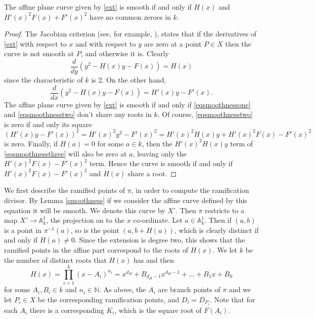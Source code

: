     \begin{lem}\label{smoothness}
    The affine plane curve given by \eqref{ext} is smooth if and only if $H(x)$ and $H'(x)^2 F(x) + F'(x)^2$ have no common zeroes in $k$.
    \end{lem}
    \begin{proof}
    The Jacobian criterion (see, for example, \cite[Thm. 4.2.19]{liu}), states that if the derivatives of \eqref{ext} with respect to $x$ and with respect to $y$ are zero at a point $P\in X$ then the curve is not smooth at $P$, and otherwise it is.
    Clearly
        \begin{equation}\label{eqsmoothnessone}
        \frac{d}{dy} (y^2 -H(x)y -F(x)) = H(x)
        \end{equation}
    since the characteristic of $k$ is 2.
    On the other hand,
        \begin{equation}\label{eqsmoothnesstwo}
        \frac{d}{dx} (y^2 - H(x)y -F(x)) = H'(x)y - F'(x).
        \end{equation}
    The affine plane curve given by \eqref{ext} is smooth if and only if \eqref{eqsmoothnessone} and \eqref{eqsmoothnesstwo} don't share any roots in $k$.
    Of course, \eqref{eqsmoothnesstwo} is zero if and only its square
        \begin{equation}\label{eqsmoothnessthree}
        (H'(x)y-F'(x))^2 = H'(x)^2y^2 -F'(x)^2 = H'(x)^2H(x)y + H'(x)^2F(x) - F'(x)^2
        \end{equation}
    is zero.
    Finally, if $H(a) = 0$ for some $a \in k$, then the $H'(x)^2H(x)y$ term of \eqref{eqsmoothnessthree} will also be zero at $a$, leaving only the $H'(x)^2F(x) - F'(x)^2$ term.
    Hence the curve is smooth if and only if $H'(x)^2F(x) - F'(x)^2$ and $H(x)$ share a root.
    \end{proof}

We first describe the ramified points of $\pi$, in order to compute the ramification divisor.
By Lemma \ref{smoothness} if we consider the affine curve defined by this equation it will be smooth.
We denote this curve by $X'$.
Then $\pi$ restricts to a map $X'\rightarrow \mathbb A^1_k$, the projection on to the $x$ co-ordinate.
Let $a\in \mathbb A_k^1$.
Then if $(a,b)$ is a point in $\pi^{-1}(a)$, so is the point $(a,b+H(a))$, which is clearly distinct if and only if $H(a)\neq 0$.
Since the extension is degree two, this shows that the ramified points in the affine part correspond to the roots of $H(x)$.
We let $k$ be the number of distinct roots that $H(x)$ has and then 
    \begin{equation}\label{equationcapitalh}
    H(x) = \prod_{i=1}^{k} (x-A_i)^{n_i} = x^{d_H} + B_{{d_H}-1}x^{{d_H}-1} + \ldots + B_1x + B_0
    \end{equation}
for some $A_i, B_i \in  k$ and $n_i \in \mathbb N$.
As above, the $A_i$ are branch points of $\pi$ and we let $P_i \in X$ be the corresponding ramification points, and $D_i = D_{P_i}$.
Note that for each $A_i$ there is a corresponding $K_i$, which is the square root of $F(A_i)$.

